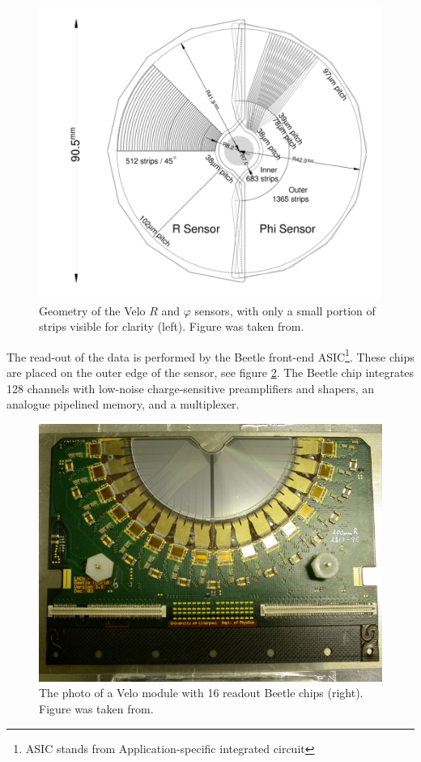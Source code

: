 \begin{figure}[h]
 \begin{center}
  \includegraphics[width=0.8\linewidth]{figures/VeloGeometry.PNG}
   \caption{Geometry of the Velo $R$ and  $\varphi$ sensors, with only a small portion of strips visible for clarity (left). 
   Figure was taken from\cite{lhcb}.  
     \label{fig:velo}}
 \end{center}
\end{figure}

The read-out of the data is performed by the Beetle front-end ASIC\footnote{ASIC stands from Application-specific integrated circuit}\cite{Beetle}. These chips are placed on the outer edge of the sensor, see figure \ref{fig:velo1}. The Beetle chip integrates 128 channels with low-noise charge-sensitive preamplifiers and shapers, an analogue pipelined memory, and a multiplexer.

\begin{figure}[h]
 \begin{center}
   \includegraphics[width=0.6\linewidth]{figures/Velo_photo.jpg}
   \caption{
   The photo of a Velo module with 16 readout Beetle chips (right). 
   Figure was taken from\cite{lhcb}.  
     \label{fig:velo1}}
 \end{center}
\end{figure}

